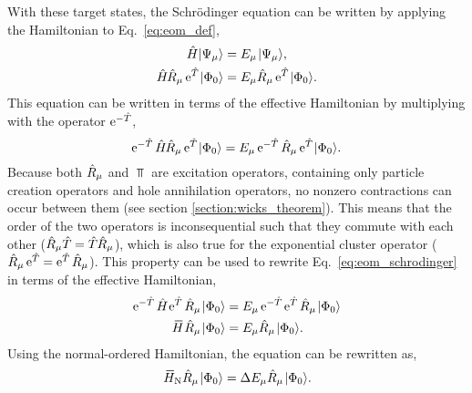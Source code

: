 \documentclass[thesis.tex]{subfiles}
\begin{document}
With these target states, the Schr\"odinger equation can be written by applying the Hamiltonian to Eq.\ \eqref{eq:eom_def},
\begin{gather}
  \Ham\ket{\Psi_{\mu}} = E_{\mu}\ket{\Psi_{\mu}}, \notag \\
  \Ham\Rop_{\mu}\E^{\Top}\refket = E_{\mu}\Rop_{\mu}\E^{\Top}\refket.
\end{gather}
This equation can be written in terms of the effective Hamiltonian by multiplying with the operator $\operatorname{e}^{-\hat{T}\hspace{-0.25pt}}$,
\begin{equation} \label{eq:eom_schrodinger}
  \operatorname{e}^{-\hat{T}\hspace{-0.25pt}}\hat{H}\hspace{-1pt}\hat{R}\hspace{-0.1pt}_{\mu}\operatorname{e}^{\hat{T}\hspace{-0.25pt}}\hspace{1pt}\lvert \Phi_{0} \rangle = E_{\mu}\operatorname{e}^{-\hat{T}\hspace{-0.25pt}}\hat{R}\hspace{-0.1pt}_{\mu}\operatorname{e}^{\hat{T}\hspace{-0.25pt}}\hspace{1pt}\lvert \Phi_{0} \rangle.
\end{equation}
Because both $\hat{R}\hspace{-0.1pt}_{\mu}$ and $\Top$ are excitation operators, containing only particle creation operators and hole annihilation operators, no nonzero contractions can occur between them (see section \ref{section:wicks_theorem}).  This means that the order of the two operators is inconsequential such that they commute with each other ($\hat{R}\hspace{-0.1pt}_{\mu}\hat{T}\hspace{-0.25pt} = \hat{T}\hspace{-0.25pt}\hat{R}\hspace{-0.1pt}_{\mu}$), which is also true for the exponential cluster operator ($\hat{R}\hspace{-0.1pt}_{\mu}\operatorname{e}^{\hat{T}\hspace{-0.25pt}} = \operatorname{e}^{\hat{T}\hspace{-0.25pt}}\hat{R}\hspace{-0.1pt}_{\mu}$).  This property can be used to rewrite Eq.\ \eqref{eq:eom_schrodinger} in terms of the effective Hamiltonian,
\begin{align} \label{eq:eom_schrodinger1}
  \E^{-\Top}\Ham\E^{\Top}\Rop_{\mu}\refket &= E_{\mu}\E^{-\Top}\E^{\Top}\Rop_{\mu}\refket \notag \\
  \EHam\Rop_{\mu}\refket &= E_{\mu}\Rop_{\mu}\refket.
\end{align}
Using the normal-ordered Hamiltonian, the equation can be rewritten as,
\begin{equation} \label{eq:eom_schrodinger2}
  \EHamN\Rop_{\mu}\refket = \Ecorr_{\mu}\Rop_{\mu}\refket.
\end{equation}
\end{document}
